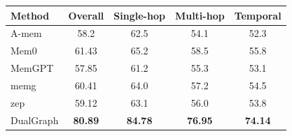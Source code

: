 \begin{tabular}{@{}lcccc@{}}
\toprule
\textbf{Method} & \textbf{Overall} & \textbf{Single-hop}
  & \textbf{Multi-hop} & \textbf{Temporal} \\
\midrule
A-mem & 58.2 & 62.5 & 54.1 & 52.3 \\
Mem0 & 61.43 & 65.2 & 58.5 & 55.8 \\
MemGPT & 57.85 & 61.2 & 55.3 & 53.1 \\
memg & 60.41 & 64.0 & 57.2 & 54.5 \\
zep & 59.12 & 63.1 & 56.0 & 53.8 \\
DualGraph & \textbf{80.89} & \textbf{84.78} & \textbf{76.95} & \textbf{74.14} \\
\bottomrule
\end{tabular}